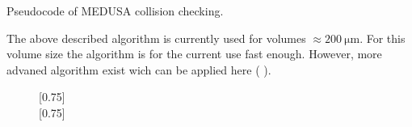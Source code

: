 %
\begin{lstfloat}[!t]
	
	\caption{Pseudocode of \acs{MEDUSA} collision checking.}
	\label{alg:medusa_collision}
\end{lstfloat}
%
The above described algorithm is currently used for volumes $\approx \SI{200}{\micro\meter}$. For this volume size the algorithm is for the current use fast enough. However, more advaned algorithm exist wich can be applied here (\eg{}  \cite{Karras2012}).
%
\begin{figure}[!t]
    \centering
    \subcaptionbox{\dummy{}}[0.75\textwidth]{
    }
    \\[2em]
    \subcaptionbox{\dummy{}}[0.75\textwidth]{
    }
	\caption{\cite{Ginsburger2019}}

	\label{fig:medusa_8}
\end{figure}
% 
